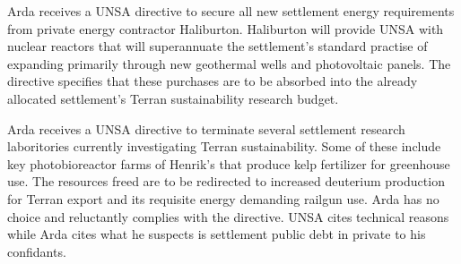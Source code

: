 Arda receives a UNSA directive to secure all new settlement energy requirements from private energy contractor Haliburton. Haliburton will provide UNSA with nuclear reactors that will superannuate the settlement's standard practise of expanding primarily through new geothermal wells and photovoltaic panels. The directive specifies that these purchases are to be absorbed into the already allocated settlement's Terran sustainability research budget. 
\StopTimelineDate

Arda receives a UNSA directive to terminate several settlement research laboritories currently investigating Terran sustainability. Some of these include key photobioreactor farms of Henrik's that produce kelp fertilizer for greenhouse use. The resources freed are to be redirected to increased deuterium production for Terran export and its requisite energy demanding railgun use. Arda has no choice and reluctantly complies with the directive. UNSA cites technical reasons while Arda cites what he suspects is settlement public debt in private to his confidants.
\StopTimelineDate

